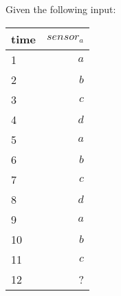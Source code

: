 
Given the following input:
\begin{table}[ht!]
\begin{center}
\begin{tabular}{|l|r|}
\hline
time & $\mathit{sensor}_a$\\
\hline
1 & $\mathit{a}$ \\
2 & $\mathit{b}$ \\
3 & $\mathit{c}$ \\
4 & $\mathit{d}$ \\
5 & $\mathit{a}$ \\
6 & $\mathit{b}$ \\
7 & $\mathit{c}$ \\
8 & $\mathit{d}$ \\
9 & $\mathit{a}$ \\
10 & $\mathit{b}$ \\
11 & $\mathit{c}$ \\
12 & ? \\
\hline
\end{tabular}
\end{center}
\end{table}

